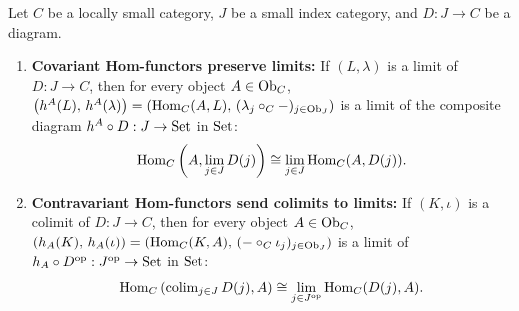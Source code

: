 \documentclass[10pt,a4paper]{article}
\begin{document}
\begin{theorem}\label{thm:hom_continuity}
Let $C$ be a locally small category, $J$ be a small index category, and $D : J \to C$ be a diagram.
\begin{enumerate}
\item \textbf{Covariant Hom-functors preserve limits:} If $(L, \lambda)$ is a limit of $D : J \to C$, then for every object $A \in {\textrm{Ob}}_C$, $\left(h^A(L),\, h^A(\lambda)\right) = \left({\textrm{Hom}}_C(A, L),\, (\lambda_j \circ_C -)_{j \in {\textrm{Ob}}_J}\right)$ is a limit of the composite diagram $h^A \circ D : J \to {\textrm{Set}}$ in ${\textrm{Set}}$:
$${\textrm{Hom}}_C\left(A, \lim_{j \in J} D(j)\right) \cong \lim_{j \in J} {\textrm{Hom}}_C(A, D(j)).$$
\item \textbf{Contravariant Hom-functors send colimits to limits:} If $(K, \iota)$ is a colimit of $D : J \to C$, then for every object $A \in {\textrm{Ob}}_C$, $\left(h_A(K),\, h_A(\iota)\right) = \left({\textrm{Hom}}_C(K, A),\, (- \circ_C \iota_j)_{j \in {\textrm{Ob}}_J}\right)$ is a limit of $h_A \circ D^{\textrm{op}} : J^{\textrm{op}} \to {\textrm{Set}}$ in ${\textrm{Set}}$:
$${\textrm{Hom}}_C\left(\mathrm{colim}_{j \in J}\, D(j), A\right) \cong \lim_{j \in J^{\textrm{op}}} {\textrm{Hom}}_C(D(j), A).$$
\end{enumerate}
\end{theorem}
\myprf
\end{document}
